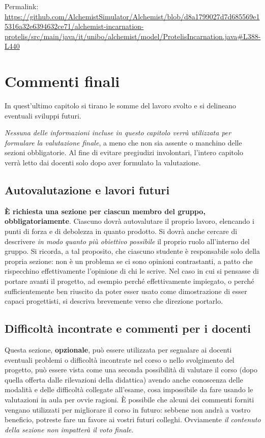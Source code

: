 \documentclass[a4paper,12pt]{report}
\begin{document}
Permalink: \url{https://github.com/AlchemistSimulator/Alchemist/blob/d8a1799027d7d685569e15316a32e6394632ce71/alchemist-incarnation-protelis/src/main/java/it/unibo/alchemist/model/ProtelisIncarnation.java#L388-L440}


\chapter{Commenti finali}

In quest'ultimo capitolo si tirano le somme del lavoro svolto e si delineano eventuali sviluppi
futuri.

\textit{Nessuna delle informazioni incluse in questo capitolo verrà utilizzata per formulare la valutazione finale}, a meno che non sia assente o manchino delle sezioni obbligatorie.
%
Al fine di evitare pregiudizi involontari, l'intero capitolo verrà letto dai docenti solo dopo aver formulato la valutazione.

\section{Autovalutazione e lavori futuri}

\textbf{È richiesta una sezione per ciascun membro del gruppo, obbligatoriamente}.
%
Ciascuno dovrà autovalutare il proprio lavoro, elencando i punti di forza e di debolezza in quanto prodotto.
Si dovrà anche cercare di descrivere \emph{in modo quanto più obiettivo possibile} il proprio ruolo all'interno del gruppo.
Si ricorda, a tal proposito, che ciascuno studente è responsabile solo della propria sezione: non è un problema se ci sono opinioni contrastanti, a patto che rispecchino effettivamente l'opinione di chi le scrive.
Nel caso in cui si pensasse di portare avanti il progetto, ad esempio perché effettivamente impiegato, o perché sufficientemente ben riuscito da poter esser usato come dimostrazione di esser capaci progettisti, si descriva brevemente verso che direzione portarlo.

\section{Difficoltà incontrate e commenti per i docenti}

Questa sezione, \textbf{opzionale}, può essere utilizzata per segnalare ai docenti eventuali problemi o difficoltà incontrate nel corso o nello svolgimento del progetto, può essere vista come una seconda possibilità di valutare il corso (dopo quella offerta dalle rilevazioni della didattica) avendo anche conoscenza delle modalità e delle difficoltà collegate all'esame, cosa impossibile da fare usando le valutazioni in aula per ovvie ragioni.
%
È possibile che alcuni dei commenti forniti vengano utilizzati per migliorare il corso in futuro: sebbene non andrà a vostro beneficio, potreste fare un favore ai vostri futuri colleghi.
%
Ovviamente \textit{il contenuto della sezione non impatterà il voto finale}.
\end{document}
